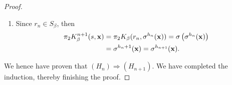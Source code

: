 \begin{proof}
\begin{enumerate}[label = (\alph*)]
\begin{enumerate}[label=(\roman*)]
                    \begin{align}
                        \pi_1 K_\beta^{n+1}(s,\xf) &= \pi_1 K_\beta(r_n, \sigma^{h_n}(\xf))\\
                        & = \beta r_n - \left[\sigma^{h_n}(\xf)\right]_1\\
                        & = \beta r_n - \xf_{h_n+1},
                    \end{align}
                    and 
                    \begin{align}
                        \pi_1 K_\beta^{n+1}(s,\xf_{1:h_{n+1}}\yf) &= \pi_1 K_\beta(r_n, \sigma^{h_n}(\xf_{1:h_{n+1}}\yf))\\
                        & = \beta r_n - \left[\sigma^{h_n}(\xf_{1:h_{n+1}}\yf)\right]_1\\
                        & = \beta r_n - \left[\sigma^{h_n}(\xf_{1:h_n+1}\yf)\right]_1\\
                        & = \beta r_n - \xf_{h_n+1},
                    \end{align}
                    so 
                    \begin{equation}
                        r_{n+1} := \pi_1 K_\beta^{n+1}(s,\xf) = \pi_1 K_\beta^{n+1}(s,\xf_{1:h_{n+1}}\yf),
                    \end{equation}
                    and note that $r_{n+1} = \beta r_n - \xf_{h_n+1}$.
                    \item Since $r_n \in S_\beta$, then 
                    \begin{align}
                        \pi_2 K_\beta^{n+1}(s,{\bf x}) &= \pi_2 K_\beta(r_n, \sigma^{h_n}({\bf x})) = \sigma\left(\sigma^{h_{n}}({\bf x})\right)\\
                        & = \sigma^{h_{n}+1}({\bf x}) = \sigma^{h_{n+1}}({\bf x}).
                    \end{align}
                \end{enumerate}
    \end{enumerate}
    We hence have proven that $(H_n) \Rightarrow (H_{n+1})$. We have completed the induction, thereby finishing the proof.
\end{proof}

